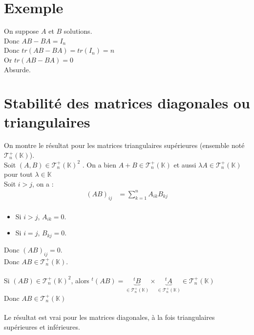 \documentclass[../main.tex]{subfiles}
\begin{document}
\setcounter{section}{32}
\section{Exemple}
On suppose $A$ et $B$ solutions. \\
Donc $AB - BA = I_n$ \\
Donc $tr(AB - BA) = tr(I_n) = n$ \\
Or $tr(AB - BA) = 0$ \\
Absurde. 

\setcounter{section}{36}
\section{Stabilité des matrices diagonales ou triangulaires}
On montre le résultat pour les matrices triangulaires supérieures (ensemble noté $\mathcal{T}_n^+(\mathbb{K})$). \\
Soit $(A,B) \in \mathcal{T}_n^+(\mathbb{K})^2$ . On a bien $A + B \in \mathcal{T}_n^+(\mathbb{K})$ et aussi $\lambda A \in \mathcal{T}_n^+(\mathbb{K})$ pour tout $\lambda \in \mathbb{K}$ \\
Soit $i > j$, on a : 
\begin{align*}
    (AB)_{ij} &= \sum^n_{k=1} A_{ik}B_{kj} \\
\end{align*}
\begin{itemize}
    \item Si $i > j$, $A_{ik} = 0$.
    \item Si $i = j$, $B_{kj} = 0$.
\end{itemize}
Donc $(AB)_{ij} = 0$. \\
Donc $AB \in \mathcal{T}_n^+(\mathbb{K})$. \\ \\

Si $(AB) \in \mathcal{T}_n^+(\mathbb{K})^2$, alors $^t(AB) = \underbrace{^tB}_{\in \mathcal{T}_n^+(\mathbb{K})} \times \underbrace{^tA}_{\in \mathcal{T}_n^+(\mathbb{K})} \in \mathcal{T}_n^+(\mathbb{K})$ \\
Donc $AB \in \mathcal{T}_n^+(\mathbb{K})$ \\ \\

Le résultat est vrai pour les matrices diagonales, à la fois triangulaires supérieures et inférieures. 

\setcounter{section}{40}
\end{document}
